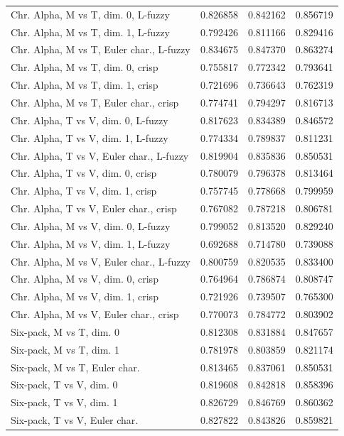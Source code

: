 \begin{longtable}{lrrr}
Chr. Alpha, M vs T, dim. 0, L-fuzzy & 0.826858 & 0.842162 & 0.856719 \\
Chr. Alpha, M vs T, dim. 1, L-fuzzy & 0.792426 & 0.811166 & 0.829416 \\
Chr. Alpha, M vs T, Euler char., L-fuzzy & 0.834675 & 0.847370 & 0.863274 \\
Chr. Alpha, M vs T, dim. 0, crisp & 0.755817 & 0.772342 & 0.793641 \\
Chr. Alpha, M vs T, dim. 1, crisp & 0.721696 & 0.736643 & 0.762319 \\
Chr. Alpha, M vs T, Euler char., crisp & 0.774741 & 0.794297 & 0.816713 \\
Chr. Alpha, T vs V, dim. 0, L-fuzzy & 0.817623 & 0.834389 & 0.846572 \\
Chr. Alpha, T vs V, dim. 1, L-fuzzy & 0.774334 & 0.789837 & 0.811231 \\
Chr. Alpha, T vs V, Euler char., L-fuzzy & 0.819904 & 0.835836 & 0.850531 \\
Chr. Alpha, T vs V, dim. 0, crisp & 0.780079 & 0.796378 & 0.813464 \\
Chr. Alpha, T vs V, dim. 1, crisp & 0.757745 & 0.778668 & 0.799959 \\
Chr. Alpha, T vs V, Euler char., crisp & 0.767082 & 0.787218 & 0.806781 \\
Chr. Alpha, M vs V, dim. 0, L-fuzzy & 0.799052 & 0.813520 & 0.829240 \\
Chr. Alpha, M vs V, dim. 1, L-fuzzy & 0.692688 & 0.714780 & 0.739088 \\
Chr. Alpha, M vs V, Euler char., L-fuzzy & 0.800759 & 0.820535 & 0.833400 \\
Chr. Alpha, M vs V, dim. 0, crisp & 0.764964 & 0.786874 & 0.808747 \\
Chr. Alpha, M vs V, dim. 1, crisp & 0.721926 & 0.739507 & 0.765300 \\
Chr. Alpha, M vs V, Euler char., crisp & 0.770073 & 0.784772 & 0.803902 \\
Six-pack, M vs T, dim. 0 & 0.812308 & 0.831884 & 0.847657 \\
Six-pack, M vs T, dim. 1 & 0.781978 & 0.803859 & 0.821174 \\
Six-pack, M vs T, Euler char. & 0.813465 & 0.837061 & 0.850531 \\
Six-pack, T vs V, dim. 0 & 0.819608 & 0.842818 & 0.858396 \\
Six-pack, T vs V, dim. 1 & 0.826729 & 0.846769 & 0.860362 \\
Six-pack, T vs V, Euler char. & 0.827822 & 0.843826 & 0.859821 \\

\end{longtable}
